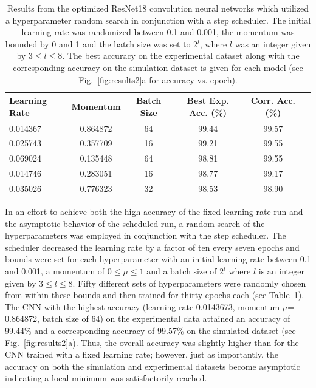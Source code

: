 \documentclass[10pt,journal,compsoc]{IEEEtran}
\begin{document}
\begin{table}
\centering
{\scriptsize
\begin{tabular}{lccccc}
\toprule
 Learning Rate &  Momentum &  Batch Size &  Best Exp. Acc. (\%) &  Corr. Acc. (\%) \\
\midrule
      0.014367 &  0.864872 &   64 &               99.44 &           99.57 \\
      0.025743 &  0.357709 &   16 &               99.21 &           99.55 \\
      0.069024 &  0.135448 &   64 &               98.81 &           99.55 \\
      0.014746 &  0.283051 &   16 &               98.77 &           99.17 \\
      0.035026 &  0.776323 &   32 &               98.53 &           98.90 \\
\bottomrule
\end{tabular}
}
  \caption{\label{table:random_results}Results from the optimized ResNet18 convolution neural networks which utilized a hyperparameter random search in conjunction with a step scheduler. The initial learning rate was randomized between 0.1 and 0.001, the momentum was bounded by 0 and 1 and the batch size was set to 2$^l$, where $l$ was an integer given by $3\leq l \leq 8$. The best accuracy on the experimental dataset along with the corresponding accuracy on the simulation dataset is given for each model (see Fig.~\ref{fig:results2}a for accuracy vs. epoch).}
\end{table}

In an effort to achieve both the high accuracy of the fixed learning rate run and the asymptotic behavior of the scheduled run, a random search \cite{bergstra2012random} of the hyperparameters was employed in conjunction with the step scheduler. The scheduler decreased the learning rate by a factor of ten every seven epochs and bounds were set for each hyperparameter with an initial learning rate between 0.1 and 0.001, a momentum of $0\leq \mu \leq 1$ and a batch size of $2^l$ where $l$ is an integer given by $3\leq l \leq 8$. Fifty different sets of hyperparameters were randomly chosen from within these bounds and then trained for thirty epochs each (see Table~\ref{table:random_results}). The CNN with the highest accuracy (learning rate 0.0143673, momentum $\mu$= 0.864872, batch size of 64) on the experimental data attained an accuracy of 99.44\% and a corresponding accuracy of 99.57\% on the simulated dataset (see Fig.~\ref{fig:results2}a). Thus, the overall accuracy was slightly higher than for the CNN trained with a fixed learning rate; however, just as importantly, the accuracy on both the simulation and experimental datasets become asymptotic indicating a local minimum was satisfactorily reached. 
\end{document}
